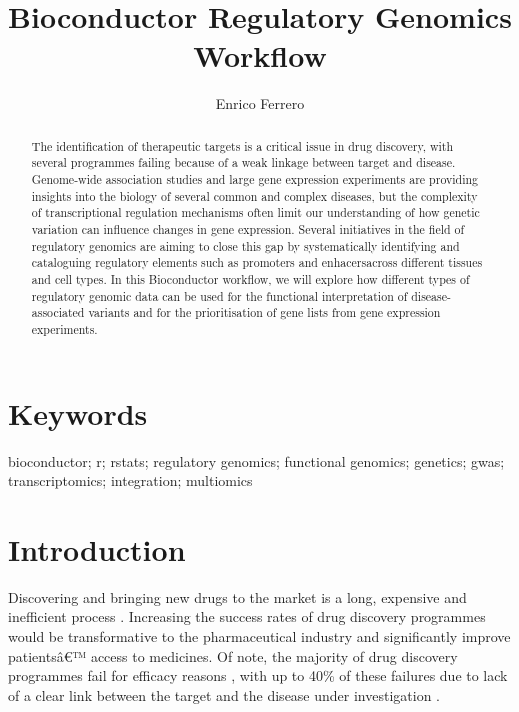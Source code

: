 \documentclass[9pt,a4paper,]{extarticle}
\begin{document}
\pagestyle{front}

\title{Bioconductor Regulatory Genomics Workflow}

\author{Enrico Ferrero}

\maketitle
\thispagestyle{front}

\begin{abstract}
The identification of therapeutic targets is a critical issue in drug discovery, with several programmes failing because of a weak linkage between target and disease. Genome-wide association studies and large gene expression experiments are providing insights into the biology of several common and complex diseases, but the complexity of transcriptional regulation mechanisms often limit our understanding of how genetic variation can influence changes in gene expression. Several initiatives in the field of regulatory genomics are aiming to close this gap by systematically identifying and cataloguing regulatory elements such as promoters and enhacersacross different tissues and cell types. In this Bioconductor workflow, we will explore how different types of regulatory genomic data can be used for the functional interpretation of disease-associated variants and for the prioritisation of gene lists from gene expression experiments.
\end{abstract}

\section*{Keywords}
bioconductor; r; rstats; regulatory genomics; functional genomics; genetics; gwas; transcriptomics; integration; multiomics


\clearpage
\pagestyle{main}

\section{Introduction}\label{introduction}

Discovering and bringing new drugs to the market is a long, expensive and inefficient process \citep{Waring2015, DiMasi2016}.
Increasing the success rates of drug discovery programmes would be transformative to the pharmaceutical industry and significantly improve patientsâ\euro{}™ access to medicines.
Of note, the majority of drug discovery programmes fail for efficacy reasons \citep{Harrison2016}, with up to 40\% of these failures due to lack of a clear link between the target and the disease under investigation \citep{Cook2014}.
\end{document}
